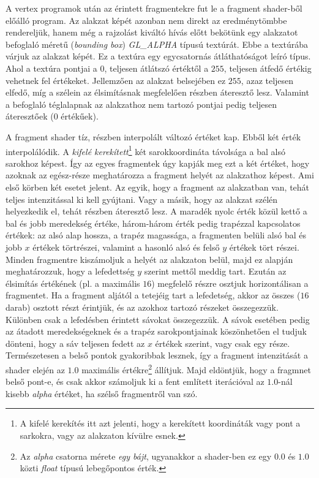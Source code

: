 \documentclass[12pt]{report}
\theoremstyle{definition}
\newcommand{\inenglish}[1]{\textsl{#1}}
\newcommand{\func}[1]{{\textsl{#1}}}
\begin{document}
A vertex programok után az érintett fragmentekre fut le a fragment shader-ből
előálló program. Az alakzat képét azonban nem direkt az eredménytömbbe
rendereljük, hanem még a rajzolást kiváltó hívás előtt bekötünk egy alakzatot
befoglaló méretű (\inenglish{bounding box}) \func{GL\_ALPHA} típusú textúrát.
Ebbe a textúrába várjuk az alakzat képét. Ez a textúra egy egycsatornás
átláthatóságot leíró típus. Ahol a textúra pontjai a $0$, teljesen átlátszó
értéktől a $255$, teljesen átfedő értékig vehetnek fel értékeket. Jellemzően az
alakzat belsejében ez $255$, azaz teljesen elfedő, míg a szélein az
élsimításnak megfelelően részben áteresztő lesz. Valamint a befoglaló
téglalapnak az alakzathoz nem tartozó pontjai pedig teljesen áteresztőek ($0$
értékűek).

A fragment shader tíz, részben interpolált változó értéket kap. Ebből két érték
interpolálódik. A \emph{kifelé kerekített}\footnote{A kifelé kerekítés itt azt
jelenti, hogy a kerekített koordináták vagy pont a sarkokra, vagy az alakzaton
kívülre esnek.} két sarokkoordináta távolsága a bal alsó sarokhoz képest. Így
az egyes fragmentek úgy kapják meg ezt a két értéket, hogy azoknak az
egész-része meghatározza a fragment helyét az alakzathoz képest. Ami első
körben két esetet jelent. Az egyik, hogy a fragment az alakzatban van, tehát
teljes intenzitással ki kell gyújtani. Vagy a másik, hogy az alakzat szélén
helyezkedik el, tehát részben áteresztő lesz. A maradék nyolc érték közül kettő
a bal és jobb meredekség értéke, három-három érték pedig trapézzal kapcsolatos
értékek: az alsó alap hossza, a trapéz magassága, a fragmenten belüli alsó bal
és jobb $x$ értékek törtrészei, valamint a hasonló alsó és felső $y$ értékek
tört részei. Minden fragmentre kiszámoljuk a helyét az alakzaton belül, majd ez
alapján meghatározzuk, hogy a lefedettség $y$ szerint mettől meddig tart.
Ezután az élsimítás értékének (pl. a maximális $16$) megfelelő részre osztjuk
horizontálisan a fragmentet. Ha a fragment aljától a tetejéig tart a
lefedetség, akkor az összes ($16$ darab) osztott részt érintjük, és az azokhoz
tartozó részeket összegezzük. Különben csak a lefedésben érintett sávokat
összegezzük. A sávok esetében pedig az átadott meredekségeknek és a trapéz
sarokpontjainak köszönhetően el tudjuk dönteni, hogy a sáv teljesen fedett az
$x$ értékek szerint, vagy csak egy része. Természetesen a belső pontok
gyakoribbak lesznek, így a fragment intenzitását a shader elején az $1.0$
maximális értékre\footnote{Az \emph{alpha} csatorna mérete \emph{egy bájt},
ugyanakkor a shader-ben ez egy $0.0$ és $1.0$ közti \func{float} típusú
lebegőpontos érték.} állítjuk. Majd eldöntjük, hogy a fragmnet belső pont-e, és
csak akkor számoljuk ki a fent említett iterációval az $1.0$-nál kisebb
\emph{alpha} értéket, ha szélső fragmentről van szó.
\end{document}
